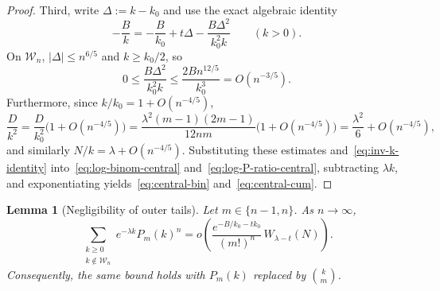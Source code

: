 \documentclass[11pt,a4paper]{article}
\newtheorem{lemma}[theorem]{Lemma}
\theoremstyle{remark}
\begin{document}
\begin{proof}
Third, write $\Delta := k - k_0$ and use the exact algebraic identity
\begin{equation}\label{eq:inv-k-identity}
  -\frac{B}{k} = -\frac{B}{k_0} + t\Delta - \frac{B\Delta^2}{k_0^2 k}
  \qquad (k>0).
\end{equation}
On $\mathcal{W}_n$, $|\Delta|\le n^{6/5}$ and $k\ge k_0/2$, so
\[
  0 \le \frac{B\Delta^2}{k_0^2 k} \le \frac{2B n^{12/5}}{k_0^3} = O(n^{-3/5}).
\]
Furthermore, since $k/k_0 = 1 + O(n^{-4/5})$,
\[
  \frac{D}{k^2} = \frac{D}{k_0^2}\bigl(1 + O(n^{-4/5})\bigr)
  = \frac{\lambda^2 (m-1)(2m-1)}{12nm}\bigl(1 + O(n^{-4/5})\bigr)
  = \frac{\lambda^2}{6} + O(n^{-4/5}),
\]
and similarly $N/k = \lambda + O(n^{-4/5})$. Substituting these estimates and~\eqref{eq:inv-k-identity} into~\eqref{eq:log-binom-central} and~\eqref{eq:log-P-ratio-central}, subtracting $\lambda k$, and exponentiating yields~\eqref{eq:central-bin} and~\eqref{eq:central-cum}.
\end{proof}

\begin{lemma}[Negligibility of outer tails]\label{lem:tails}
Let $m\in\{n-1,n\}$. As $n\to\infty$,
\[
  \sum_{\substack{k\ge 0 \\ k\notin \mathcal{W}_n}} e^{-\lambda k} P_m(k)^n
  = o\!\left(\frac{e^{-B/k_0 - t k_0}}{(m!)^n}\,W_{\lambda - t}(N)\right).
\]
Consequently, the same bound holds with $P_m(k)$ replaced by $\binom{k}{m}$.
\end{lemma}
\end{document}
